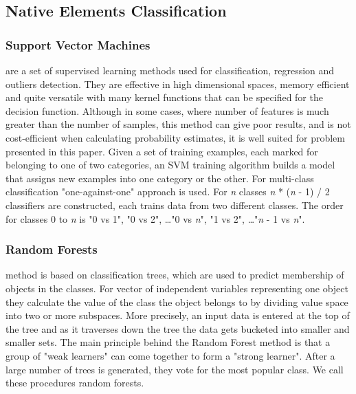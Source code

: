 \documentclass{llncs}
\begin{document}
\subsection{Native Elements Classification}


\subsubsection{Support Vector Machines}
are a set of supervised learning methods used for classification, regression and outliers detection. They are effective in high dimensional spaces, memory efficient and quite versatile with many kernel functions that can be specified for the decision function. Although in some cases, where number of features is much greater than the number of samples, this method can give poor results, and is not cost-efficient when calculating probability estimates, it is well suited for problem presented in this paper. Given a set of training examples, each marked for belonging to one of two categories, an SVM training algorithm builds a model that assigns new examples into one category or the other. For multi-class classification "one-against-one" approach is used. For \textit{n} classes \textit{n} * (\textit{n} - 1) / 2 classifiers are constructed, each trains data from two different classes. The order for classes 0 to \textit{n} is "0 vs 1", "0 vs 2", \dots "0 vs \textit{n}", "1 vs 2", \dots "\textit{n} - 1 vs \textit{n}".

\subsubsection{Random Forests}
method is based on classification trees, which are used to predict membership of objects in the classes.
For vector of independent variables representing one object they calculate the value of the class the object belongs to by dividing value space into two or more subspaces. More precisely, an input data is entered at the top of the tree and as it traverses down the tree the data gets bucketed into smaller and smaller sets.
The main principle behind the Random Forest method is that a group of "weak learners" can come together to form a "strong learner". 
After a large number of trees is generated, they vote for the most popular class.
We call these procedures random forests.
\end{document}
